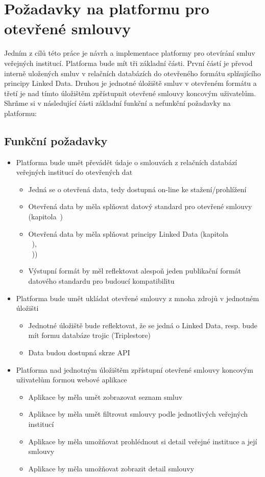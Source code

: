 \chapter{Požadavky na platformu pro otevřené smlouvy}
\label{sec:kap5}

Jedním z cílů této práce je návrh a implementace platformy pro otevírání smluv veřejných institucí. Platforma bude mít tři základní části. První částí je převod interně uložených smluv v relačních databázích do otevřeného formátu splňujícího principy Linked Data. Druhou je jednotné úložiště smluv v otevřeném formátu a třetí je nad tímto úložištěm zpřístupnit otevřené smlouvy koncovým uživatelům. Shrňme si v následující části základní funkční a nefunkční požadavky na platformu: 

\section{Funkční požadavky}

\begin{itemize}
\item Platforma bude umět převádět údaje o smlouvách z relačních databází veřejných institucí do otevřených dat
	\begin{itemize}
	\item Jedná se o otevřená data, tedy dostupná on-line ke stažení/prohlížení
	\item Otevřená data by měla splňovat datový standard pro otevřené smlouvy (kapitola~)
	\item Otevřená data by měla splňovat principy Linked Data (kapitola\\~),\\~))
	\item Výstupní formát by měl reflektovat alespoň jeden publikační formát datového standardu pro budoucí kompatibilitu
	\end{itemize}
\item Platforma bude umět ukládat otevřené smlouvy z mnoha zdrojů v jednotném úložišti
	\begin{itemize}
	\item Jednotné úložiště bude reflektovat, že se jedná o Linked Data, resp. bude mít formu databáze trojic (Triplestore)
	\item Data budou dostupná skrze API
	\end{itemize}
\item Platforma nad jednotným úložištěm zpřístupní otevřené smlouvy koncovým uživatelům formou webové aplikace
	\begin{itemize}
	\item Aplikace by měla umět zobrazovat seznam smluv
	\item Aplikace by měla umět filtrovat smlouvy podle jednotlivých veřejných institucí
	\item Aplikace by měla umožňovat prohlédnout si detail veřejné instituce a její smlouvy
	\item Aplikace by měla umožňovat zobrazit detail smlouvy 
	\end{itemize}
\end{itemize}

